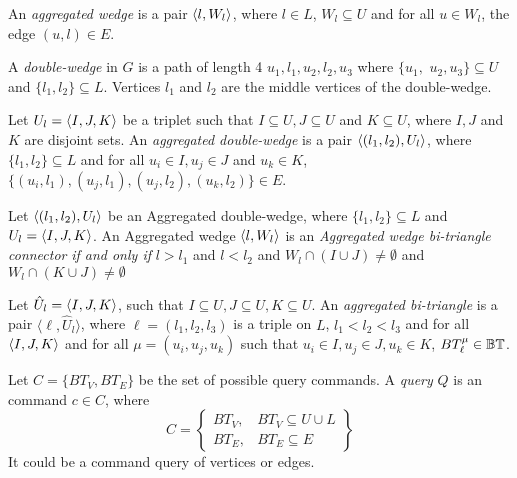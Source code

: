 \begin{definition}\label{def:awg}
An \textit{aggregated wedge} is a pair $\left\langle l, W_l \right\rangle$, where $l \in L$, $W_l \subseteq U$ and for all $u\in W_l$, the edge  $(u,l)\in E$. 
\end{definition}

\begin{definition}
A \textit{double-wedge} in $G$ is a path of length 4 $u_1,l_1,u_2,l_2,u_3$ where  $\{u_1,$ $u_2,u_3\}\subseteq U$ and $\{l_1,l_2\}\subseteq L$. Vertices $l_1$ and $l_2$ are the middle vertices of the double-wedge. 
\end{definition}
  
\begin{definition}\label{def:adwg}
Let $U_l = \left\langle I, J, K\right\rangle$ be a triplet such that $I \subseteq U, J \subseteq U$ and $K \subseteq U$, where $I, J$ and $K$ are disjoint sets. 
An \textit{aggregated double-wedge}  is a pair  $\left\langle (l_1, l_2), U_l \right\rangle$, where $\{l_1,l_2\}\subseteq L$ and  for all $u_i \in I, u_j \in J$ and $u_k \in K$, $\{(u_i, l_1), (u_j, l_1), (u_j, l_2), (u_k, l_2)\} \in E$.
\end{definition}

\begin{definition}\label{def:awgc}
Let $\left\langle (l_1, l_2), U_l \right\rangle$ be an Aggregated double-wedge, where $\{l_1,l_2\}\subseteq L$ and $U_l = \left\langle I, J, K\right\rangle$.
An Aggregated wedge $\left\langle l, W_l \right\rangle$ is an \textit{Aggregated wedge bi-triangle connector} \emph{if and only if} $l > l_1$ and $l < l_2$ and $W_l \cap (I \cup J) \neq \emptyset$ and $W_l \cap (K \cup J) \neq \emptyset$
\end{definition}
      
\begin{definition}\label{def:abt}
Let $\hat{U}_l=\left\langle I, J, K\right\rangle$, such that $I \subseteq U, J \subseteq U, K \subseteq U$. An \textit{aggregated bi-triangle}  is a pair  $\langle \ell, \hat{U}_l\rangle$, 
where $\ell=(l_1, l_2, l_3)$ is a triple on $L$, $l_1 < l_2 < l_3$ and for all $\left\langle I, J, K\right\rangle$ and for all $\mu=(u_i, u_j, u_k)$ such that $u_i \in I, u_j \in J, u_k \in K$, $BT_{\ell}^{\mu}\in \mathbb{BT}$.
\end{definition}

\begin{definition}[Query] 
Let $C=\{BT_V, BT_E\}$ be the set of possible query commands.
A \textit{query} $Q$ is an command $c \in C$, where 
\[
C = \left\{\begin{array}{lr}
BT_V, & BT_V \subseteq U\cup L\\
BT_E, & BT_E \subseteq E
\end{array}\right\} 
\]
It could be a command query of vertices or edges.
\end{definition}

